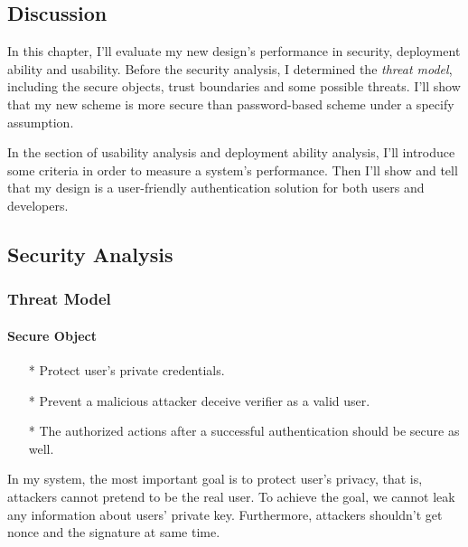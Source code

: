 \begin{CJK}{Bg5}{bsmi}


\chapter{Discussion}
\label{cha:discussion}

In this chapter, I'll evaluate my new design's performance in security, deployment ability and usability. Before the security analysis, I determined the \emph{threat model}\cite{threat-model}, including the secure objects, trust boundaries and some possible threats. I'll show that my new scheme is more secure than password-based scheme under a specify assumption.

In the section of usability analysis and deployment ability analysis, I'll introduce some criteria in order to measure a system's performance. Then I'll show and tell that my design is a user-friendly authentication solution for both users and developers.

\section{Security Analysis}

\subsection{Threat Model}

\subsubsection{Secure Object}

\begin{enumerate}
\item[*] Protect user's private credentials.
\item[*] Prevent a malicious attacker deceive verifier as a valid user.
\\
\item[*] The authorized actions after a successful authentication should be secure as well.
\end{enumerate}

In my system, the most important goal is to protect user's privacy, that is, attackers cannot pretend to be the real user. To achieve the goal, we cannot leak any information about users' private key. Furthermore, attackers shouldn't get nonce and the signature at same time.


\end{CJK}
